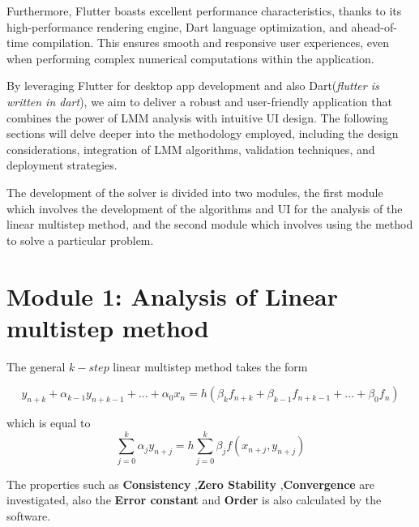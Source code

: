 Furthermore, Flutter boasts excellent performance characteristics, thanks to its high-performance rendering engine, Dart language optimization, and ahead-of-time compilation. This ensures smooth and responsive user experiences, even when performing complex numerical computations within the application.

By leveraging Flutter for desktop app development and also Dart(\textit{flutter is written in dart}), we aim to deliver a robust and user-friendly application that combines the power of LMM analysis with intuitive UI design. The following sections will delve deeper into the methodology employed, including the design considerations, integration of LMM algorithms, validation techniques, and deployment strategies.



The development of the solver is divided into two modules, the first module which involves the development of the algorithms and UI for the analysis of the linear multistep method, and the second module which involves using the method to solve a particular problem. 



\section{Module 1: Analysis of Linear multistep method}
The general $k-step$ linear multistep method takes the form 


\begin{equation}
   y_{n+k} + \alpha_{k-1}y_{n+k-1}+ \dots + \alpha_0x_n = h(\beta_kf_{n+k}+ \beta_{k-1}f_{n+k-1}+ \dots + \beta_0f_n) 
\end{equation}

which is equal to 
\begin{equation}
   \sum_{j=0}^{k} \alpha_j y_{n+j} = h \sum_{j=0}^{k} \beta_j f(x_{n+j}, y_{n+j})
\end{equation} \cite{2022JFatokunEtAl}

The properties such as \textbf{Consistency} ,\textbf{Zero Stability} ,\textbf{Convergence} are investigated, also the \textbf{Error constant} and \textbf{Order} is also calculated by the software.

